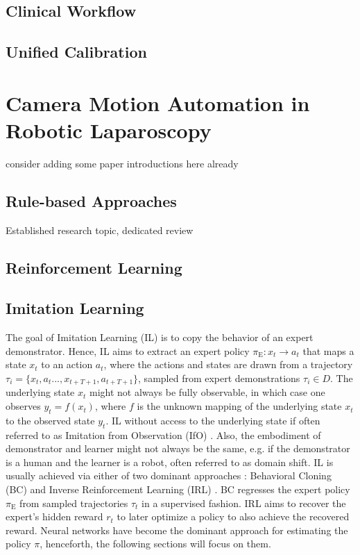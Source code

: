 \subsection{Clinical Workflow}
\subsection{Unified Calibration}

\section{Camera Motion Automation in Robotic Laparoscopy}
consider adding some paper introductions here already

\subsection{Rule-based Approaches}
Established research topic, dedicated review

\subsection{Reinforcement Learning}

\subsection{Imitation Learning}
The goal of Imitation Learning (IL) is to copy the behavior of an expert demonstrator. Hence, IL aims to extract an expert policy $\pi_\text{E}: x_t \rightarrow a_t$ that maps a state $x_t$ to an action $a_t$, where the actions and states are drawn from a trajectory $\tau_i = \{x_t,a_t...,x_{t+T+1},a_{t+T+1}\}$, sampled from expert demonstrations $\tau_i \in D$. The underlying state $x_t$ might not always be fully observable, in which case one observes $y_t = f(x_t)$, where $f$ is the unknown mapping of the underlying state $x_t$ to the observed state $y_t$. IL without access to the underlying state if often referred to as Imitation from Observation (IfO) \cite{liu2018imitation}. Also, the embodiment of demonstrator and learner might not always be the same, e.g. if the demonstrator is a human and the learner is a robot, often referred to as domain shift. IL is usually achieved via either of two dominant approaches \cite{osa2018algorithmic}: Behavioral Cloning (BC) \cite{pomerleau1991efficient} and Inverse Reinforcement Learning (IRL) \cite{ng2000algorithms}. BC regresses the expert policy $\pi_\text{E}$ from sampled trajectories $\tau_t$ in a supervised fashion. IRL aims to recover the expert's hidden reward $r_t$ to later optimize a policy to also achieve the recovered reward. Neural networks have become the dominant approach for estimating the policy $\pi$, henceforth, the following sections will focus on them.


